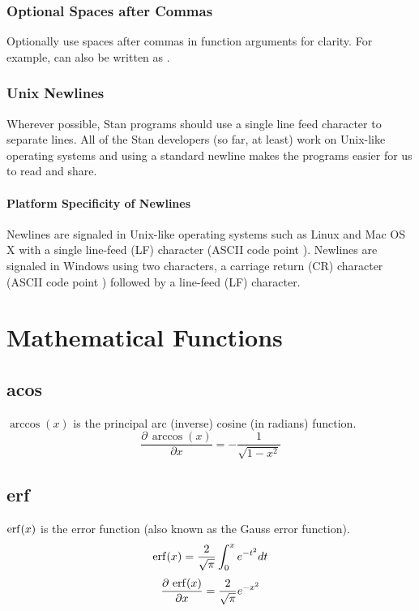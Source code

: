 \subsection{Optional Spaces after Commas}

Optionally use spaces after commas in function arguments for clarity.
For example,  can also be
written as .



\subsection{Unix Newlines}

Wherever possible, Stan programs should use a single line feed 
character to separate lines.  All of the Stan developers (so far, at 
least) work on Unix-like operating systems and using a standard 
newline makes the programs easier for us to read and share.  

\subsubsection{Platform Specificity of Newlines}

Newlines are signaled in Unix-like operating systems such as Linux and
Mac OS X with a single line-feed (LF) character (ASCII code point
).  Newlines are signaled in Windows using two characters,
a carriage return (CR) character (ASCII code point )
followed by a line-feed (LF) character.


\chapter{Mathematical Functions}\label{math-functions.appendix}

\section{acos}\label{acos-appendix.section}
$\arccos(x)$ is the principal arc (inverse) cosine (in radians) function.
%
\[
\frac{\partial \, \arccos(x)}{\partial x} = -\frac{1}{\sqrt{1-x^2}}
\]

\section{erf}\label{erf-appendix.section}
$\erf(x)$ is the error function (also known as the Gauss error function).
%
\[
\erf(x)=\frac{2}{\sqrt{\pi}}\int_0^x e^{-t^2}dt
\]
%
\[
\frac{\partial \, \erf(x)}{\partial x} = \frac{2}{\sqrt{\pi}} e^{-x^2}
\]


